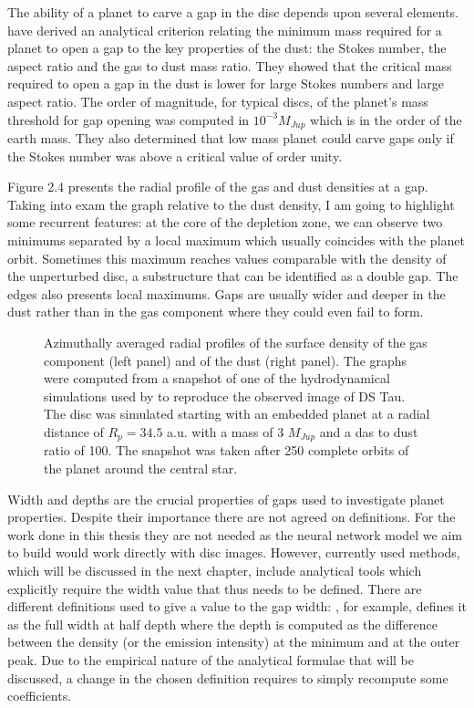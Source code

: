 \documentclass[a4paper,10pt]{report}
\begin{document}
The ability of a planet to carve a gap in the disc depends upon several elements. 
\citet{Dipierro_2017} have derived an analytical criterion relating the minimum mass required for a planet
to open a gap to the key properties of the dust: the Stokes number, the aspect ratio and the gas to dust mass ratio.
They showed that the critical mass required to open a gap in the dust is lower for large Stokes numbers
and large aspect ratio.
The order of magnitude, for typical discs, of the planet's mass threshold for gap opening was computed in $10^{-3}M_{Jup}$
which is in the order of the earth mass. They also determined that low mass planet could carve gaps only if the
Stokes number was above a critical value of order unity.

Figure 2.4 presents the radial profile of the gas and dust densities at a gap. Taking into exam 
the graph relative to the dust density, I am going to highlight some recurrent features:
at the core of the depletion zone, we can observe two minimums separated by a local maximum which usually coincides with the planet orbit.
Sometimes this maximum reaches values comparable with the density of the unperturbed disc, a substructure that can be identified as a double gap. 
The edges also presents local maximums. Gaps are usually wider and deeper in the dust rather than in the gas component where they could even
fail to form.

\begin{figure}
    \begin{center}
        
    \end{center}
    \caption{Azimuthally averaged radial profiles of the surface density of the gas component (left panel)
    and of the dust (right panel). The graphs were computed from a snapshot of one of the hydrodynamical
    simulations used by \citet{dstauv} to reproduce the observed image of DS Tau.
    The disc was simulated starting with an embedded planet at a radial distance of $R_p = 34.5$ a.u. with a mass of 3 $M_{Jup}$ and a das to dust ratio of 100.
    The snapshot was taken after 250 complete orbits of the planet around the central star.
    }
\end{figure}

Width and depths are the crucial properties of gaps used to investigate planet properties. Despite their importance there are not agreed on definitions.
For the work done in this thesis they are not needed as the neural network model we aim to build would work directly with disc images.
However, currently used methods, which will be discussed in the next chapter, include analytical tools which explicitly require the width
value that thus needs to be defined.
There are different definitions used to give a value to the gap width: \citet{Long_2018}, for example, defines it as the full width at half depth where 
the depth is computed as the difference between the density (or the emission intensity) at the minimum and at the outer peak.
Due to the empirical nature of the analytical formulae that will be discussed, a change in the chosen definition requires to simply recompute
some coefficients.                                        
\end{document}

